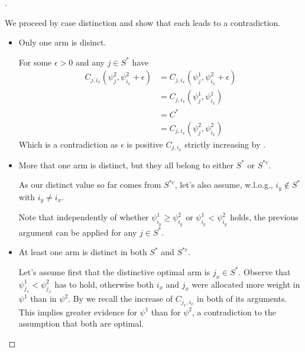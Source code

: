 \begin{proof}[]
\begin{enumerate}[(i)]
    We proceed by case distinction and show that each leads to a contradiction.
    \begin{itemize}
      \item Only one arm is disinct.

      For some $\epsilon > 0$ and any $j \in S^*$ have
      \begin{align}
        C_{j, i_x}(\psi^2_j, \psi^2_{i_x} + \epsilon) &= C_{j, i_x}(\psi^1_j, \psi^2_{i_x} + \epsilon) \\
        &= C_{j, i_x}(\psi^1_j, \psi^1_{i_x}) \\
        &= C^* \\
        &= C_{j, i_x}(\psi^2_j, \psi^2_{i_x})
      \end{align}
      Which is a contradiction as $\epsilon$ is positive $C_{j, i_x}$ strictly increasing by .
      \item More that one arm is distinct, but they all belong to either $S^*$ or $S^{*c}$.

      As our distinct value so far comes from $S^{*c}$, let's also assume, w.l.o.g., $i_y \notin S^*$ with $i_y \neq i_x$.

      Note that independently of whether $\psi^1_{i_y} \geq \psi^2_{i_y}$ or $\psi^1_{i_y} < \psi^2_{i_y}$ holds, the previous argument can be applied for any $j \in S^*$.

      \item At least one arm is distinct in both $S^*$ and $S^{*c}$.

      Let's assume first that the distinctive optimal arm is $j_x \in S^*$.
      Observe that $\psi^1_{j_x} < \psi^2_{j_x}$ has to hold, otherwise both
      $i_x$ and $j_x$ were allocated more weight in $\psi^1$ than in $\psi^2$.
      By  we recall the increase of $C_{j_x,
      i_x}$ in both of its arguments. This implies greater evidence for $\psi^1$
      than for $\psi^2$, a contradiction to the assumption that both are
      optimal.


\end{itemize}
\end{enumerate}
\end{proof}
